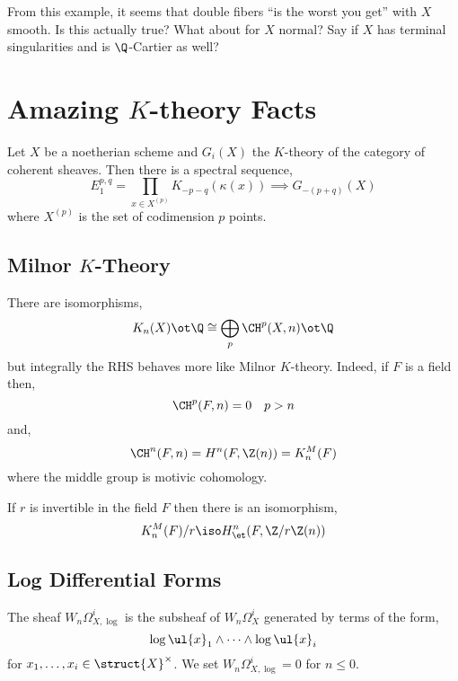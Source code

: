 \documentclass[12pt]{article}
\begin{document}
\begin{rmk}
From this example, it seems that double fibers ``is the worst you get'' with $X$ smooth. Is this actually true? What about for $X$ normal? Say if $X$ has terminal singularities and is $\Q$-Cartier as well? 
\end{rmk}

\section{Amazing $K$-theory Facts}

\begin{prop}
Let $X$ be a noetherian scheme and $G_i(X)$ the $K$-theory of the category of coherent sheaves. Then there is a spectral sequence,
\[ E^{p,q}_1 = \prod_{x \in X^{(p)}} K_{-p-q}(\kappa(x)) \implies G_{-(p+q)}(X) \]
where $X^{(p)}$ is the set of codimension $p$ points.
\end{prop}

\subsection{Milnor $K$-Theory}

\begin{prop}
There are isomorphisms,
\[ K_n(X) \ot \Q \cong \bigoplus_p \CH^p(X, n) \ot \Q \]
but integrally the RHS behaves more like Milnor $K$-theory. Indeed, if $F$ is a field then,
\[ \CH^p(F, n) = 0 \quad p > n \]
and,
\[ \CH^n(F, n) = H^n(F, \Z(n)) = K^M_n(F) \]
where the middle group is motivic cohomology.
\end{prop}

\begin{theorem}
If $r$ is invertible in the field $F$ then there is an isomorphism,
\[ K^M_n(F) / r \iso H^n_{\et}(F, \Z / r \Z(n)) \]
\end{theorem}



\subsection{Log Differential Forms}

\begin{defn}
The sheaf $W_n \Omega^i_{X, \log}$ is the \etale subsheaf of $W_n \Omega^i_X$ generated by terms of the form,
\[ \log{\ul{x}_1} \wedge \cdots \wedge \log{\ul{x}_i} \]
for $x_1, \dots, x_i \in \struct{X}^\times$. We set $W_n \Omega^i_{X, \log} = 0$ for $n \le 0$.
\end{defn}
\end{document}
